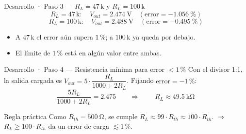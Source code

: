 \documentclass[aspectratio=169]{beamer}
\begin{document}
\begin{frame}{Desarrollo · Paso 3 — $R_L = 47\,\text{k}$ y $R_L = 100\,\text{k}$}
  \[
    R_L = 47\,\text{k}: \quad V_{out} = \SI{2.474}{\volt} \quad (\text{error} = \SI{-1.056}{\percent})
  \]
  \[
    R_L = 100\,\text{k}: \quad V_{out} = \SI{2.488}{\volt} \quad (\text{error} = \SI{-0.495}{\percent})
  \]
  \pause
  \begin{itemize}
    \item A $47\,\text{k}$ el error aún supera $1\,\text{\%}$; a $100\,\text{k}$ ya queda por debajo.
    \item El límite de $1\,\text{\%}$ está en algún valor entre ambas.
  \end{itemize}
\end{frame}

\begin{frame}{Desarrollo · Paso 4 — Resistencia mínima para error $<1\,\text{\%}$}
  Con el divisor 1:1, la salida cargada es $V_{out} = 5\cdot\dfrac{R_L}{1000+2R_L}$.
  Fijando $\text{error} = -1\,\text{\%}$:
  \[
    \frac{5R_L}{1000+2R_L} = 2.475
    \qquad\Longrightarrow\qquad
    \boxed{\,R_L \approx \SI{49.5}{\kilo\ohm}\,}
  \]
  \pause
  \begin{block}{Regla práctica}
    Como $R_{th} = \SI{500}{\ohm}$, se cumple $R_L \approx 99\cdot R_{th} \approx 100\cdot R_{th}$.
    $\Rightarrow$ \textbf{$R_L \ge 100\cdot R_{th}$} da un error de carga $\lesssim 1\,\text{\%}$.
  \end{block}
\end{frame}
\end{document}
